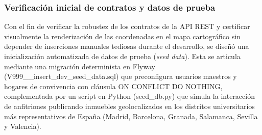 \subsubsection{Verificación inicial de contratos y datos de prueba}

Con el fin de verificar la robustez de los contratos de la API REST y certificar visualmente la renderización de las coordenadas en el mapa cartográfico sin depender de inserciones manuales tediosas durante el desarrollo, se diseñó una inicialización automatizada de datos de prueba (\emph{seed data}). Esta se articula mediante una migración determinista en Flyway (V999__insert_dev_seed_data.sql) que preconfigura usuarios maestros y hogares de convivencia con cláusula ON CONFLICT DO NOTHING, complementada por un script en Python (seed_db.py) que simula la interacción de anfitriones publicando inmuebles geolocalizados en los distritos universitarios más representativos de España (Madrid, Barcelona, Granada, Salamanca, Sevilla y Valencia).

